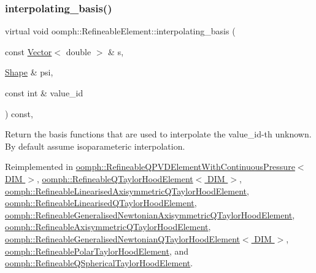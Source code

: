 \subsubsection{\texorpdfstring{interpolating\+\_\+basis()}{interpolating\_basis()}}
{\footnotesize\ttfamily virtual void oomph\+::\+Refineable\+Element\+::interpolating\+\_\+basis (\begin{DoxyParamCaption}\item[{const \hyperlink{classoomph_1_1Vector}{Vector}$<$ double $>$ \&}]{s,  }\item[{\hyperlink{classoomph_1_1Shape}{Shape} \&}]{psi,  }\item[{const int \&}]{value\+\_\+id }\end{DoxyParamCaption}) const\hspace{0.3cm}{\ttfamily [inline]}, {\ttfamily [virtual]}}



Return the basis functions that are used to interpolate the value\+\_\+id-\/th unknown. By default assume isoparameteric interpolation. 



Reimplemented in \hyperlink{classoomph_1_1RefineableQPVDElementWithContinuousPressure_a207dc7a156db01065f965adf6cfc41fd}{oomph\+::\+Refineable\+Q\+P\+V\+D\+Element\+With\+Continuous\+Pressure$<$ D\+I\+M $>$}, \hyperlink{classoomph_1_1RefineableQTaylorHoodElement_af6a401e81f0376d748178d8096d35835}{oomph\+::\+Refineable\+Q\+Taylor\+Hood\+Element$<$ D\+I\+M $>$}, \hyperlink{classoomph_1_1RefineableLinearisedAxisymmetricQTaylorHoodElement_a45e6a18e861e6c41bb2f7f668b4ec47d}{oomph\+::\+Refineable\+Linearised\+Axisymmetric\+Q\+Taylor\+Hood\+Element}, \hyperlink{classoomph_1_1RefineableLinearisedQTaylorHoodElement_af968db8940e99a22734568c400fb8af2}{oomph\+::\+Refineable\+Linearised\+Q\+Taylor\+Hood\+Element}, \hyperlink{classoomph_1_1RefineableGeneralisedNewtonianAxisymmetricQTaylorHoodElement_af23c236b7f8e18b5d9d7c37309acfd74}{oomph\+::\+Refineable\+Generalised\+Newtonian\+Axisymmetric\+Q\+Taylor\+Hood\+Element}, \hyperlink{classoomph_1_1RefineableAxisymmetricQTaylorHoodElement_a20d24729129ee059ab89b407c02d1cb8}{oomph\+::\+Refineable\+Axisymmetric\+Q\+Taylor\+Hood\+Element}, \hyperlink{classoomph_1_1RefineableGeneralisedNewtonianQTaylorHoodElement_ae0ff45825430e85d615efd287f4a5d6b}{oomph\+::\+Refineable\+Generalised\+Newtonian\+Q\+Taylor\+Hood\+Element$<$ D\+I\+M $>$}, \hyperlink{classoomph_1_1RefineablePolarTaylorHoodElement_a6add07917cd3a45ca02e3682ef6299c2}{oomph\+::\+Refineable\+Polar\+Taylor\+Hood\+Element}, and \hyperlink{classoomph_1_1RefineableQSphericalTaylorHoodElement_a3d72f67b7cb920fb9d006b440fd02922}{oomph\+::\+Refineable\+Q\+Spherical\+Taylor\+Hood\+Element}.



